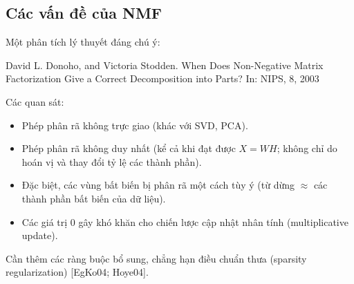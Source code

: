 \subsection{Các vấn đề của NMF}

Một phân tích lý thuyết đáng chú ý:

David L. Donoho, and Victoria Stodden. When Does Non-Negative Matrix Factorization Give a Correct Decomposition into Parts? In: NIPS, 8, 2003

Các quan sát:

\begin{itemize}
\item
  Phép phân rã không trực giao (khác với SVD, PCA).
\item
  Phép phân rã không duy nhất (kể cả khi đạt được \(X = WH\); không chỉ do hoán vị và thay đổi tỷ lệ các thành phần).
\item
  Đặc biệt, các vùng bất biến bị phân rã một cách tùy ý (từ dừng \ensuremath{\approx} các thành phần bất biến của dữ liệu).
\item
  Các giá trị 0 gây khó khăn cho chiến lược cập nhật nhân tính (multiplicative update).
\end{itemize}

Cần thêm các ràng buộc bổ sung, chẳng hạn điều chuẩn thưa (sparsity regularization) {[}EgKo04; Hoye04{]}.
